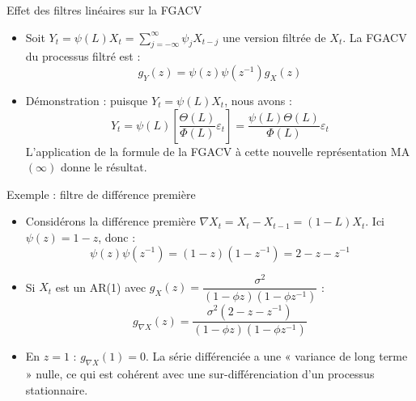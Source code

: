 \documentclass[11pt,aspectratio=169]{beamer}
\begin{document}
\begin{frame}{Effet des filtres linéaires sur la FGACV}

\begin{itemize}

\item Soit $Y_t = \psi(L)X_t = \sum_{j=-\infty}^{\infty} \psi_j X_{t-j}$ une version filtrée de $X_t$. La FGACV du processus filtré est :
  \[
  g_Y(z) = \psi(z)\psi(z^{-1}) g_X(z)
  \]\newline

\item Démonstration : puisque $Y_t = \psi(L)X_t$, nous avons :
  \[
  Y_t = \psi(L)\left[\frac{\Theta(L)}{\Phi(L)}\varepsilon_t\right] = \frac{\psi(L)\Theta(L)}{\Phi(L)}\varepsilon_t
  \]
  L'application de la formule de la FGACV à cette nouvelle représentation MA$(\infty)$ donne le résultat.

\end{itemize}

\end{frame}

\begin{frame}{Exemple : filtre de différence première}

\begin{itemize}

\item Considérons la différence première $\nabla X_t = X_t - X_{t-1} = (1-L)X_t$. Ici $\psi(z) = 1 - z$, donc :
  \[
  \psi(z)\psi(z^{-1}) = (1-z)(1-z^{-1}) = 2 - z - z^{-1}
  \]\newline

\item Si $X_t$ est un AR(1) avec $g_X(z) = \dfrac{\sigma^2}{(1-\phi z)(1-\phi z^{-1})}$ :
  \[
  g_{\nabla X}(z) = \frac{\sigma^2(2 - z - z^{-1})}{(1-\phi z)(1-\phi z^{-1})}
  \]\newline

\item En $z = 1$ : $g_{\nabla X}(1) = 0$. La série différenciée a une « variance de long terme » nulle, ce qui est cohérent avec une sur-différenciation d'un processus stationnaire.

\end{itemize}

\end{frame}
\end{document}
